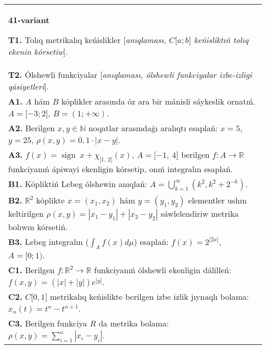 \documentclass{article}
\DeclareMathOperator{\sign}{sign}
\begin{document}
\begin{tabular}{m{17cm}}
\textbf{41-variant}
\newline

\textbf{T1.} Tolıq metrikalıq keńislikler [\textit{anıqlaması, \(C\lbrack a;b\rbrack\) keńisliktıń tolıq ekenin kórsetiw}]. \\
\textbf{T2.} Ólshewli funkciyalar [\textit{anıqlaması, ólshewli funkciyalar izbe-izligi qásiyetleri}]. \\
\textbf{A1.} \(A\) hám \(B\) kóplikler arasında óz ara bir mánisli sáykeslik ornatıń. \(A = \lbrack - 3;2\rbrack\), \(B = (1; + \infty)\). \\
\textbf{A2.} Berilgen \(x,y\mathbb{\in N}\) noqatlar arasındaǵı aralıqtı esaplań: \(x = 5\), \(y = 25\), \(\rho(x,y) = 0,1 \cdot |x - y|\). \\
\textbf{A3.} \(f(x) = \sign \ x + \chi_{\lbrack 1,\ 2\rbrack}(x)\), \(A = \lbrack - 1,\ 4\rbrack\) berilgen \(f:A\rightarrow\mathbb{R}\) funkciyanıń ápiwayi ekenligin kórsetip, onıń integralın esaplań. \\
\textbf{B1.} Kópliktiń Lebeg ólshewin anıqlań: \(A = \bigcup_{k = 1}^{\infty}\left( k^{2},k^{2} + 2^{- k} \right)\). \\
\textbf{B2.} \(\mathbb{R}^{2}\) kóplikte \(x = \left( x_{1},x_{2} \right)\) hám \(y = \left( y_{1},y_{2} \right)\) elementler ushın keltirilgen \(\rho(x,y) = \left| x_{1} - y_{1} \right| + \left| x_{2} - y_{2} \right|\) sáwlelendiriw metrika bolıwın kórsetiń. \\
\textbf{B3.} Lebeg integralın (\(\int_{A}^{}{f(x)d\mu}\)) esaplań: \(f(x) = 2^{\lbrack 2x\rbrack}\), \(A = \lbrack 0;1)\). \\
\textbf{C1.} Berilgen \(f:\mathbb{R}^{2}\mathbb{\rightarrow R}\) funkciyanıń ólshewli ekenligin dálilleń: \(f(x,y) = \left( |x| + |y| \right)e^{\lbrack y\rbrack}\). \\
\textbf{C2.} \(C\lbrack 0,1\rbrack\) metrikalıq keńislikte berilgen izbe izlik jıynaqlı bolama: \(x_{n}(t) = t^{n} - t^{n + 1}\). \\
\textbf{C3.} Berilgen funkciya \(R\) da metrika bolama: \(\rho(x,y) = \sum_{i = 1}^{n}\left| x_{i} - y_{i} \right|\). \\

\end{tabular}
\vspace{1cm}
\end{document}
